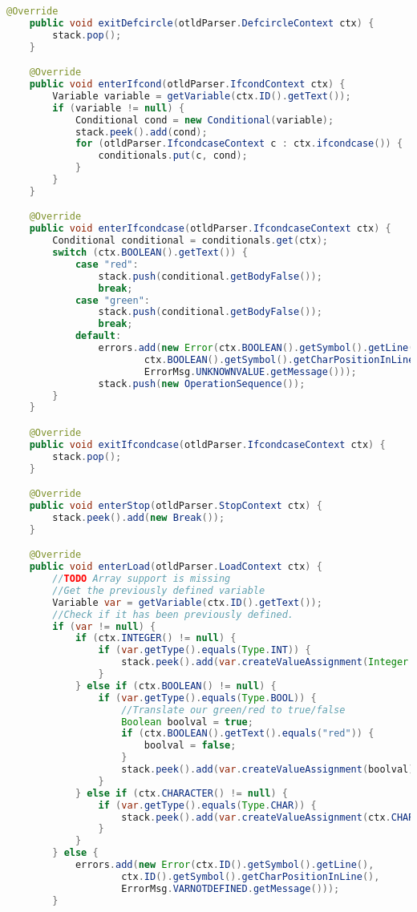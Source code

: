\begin{landscape}
\begin{lstlisting}[language=Java]
    @Override
    public void exitDefcircle(otldParser.DefcircleContext ctx) {
        stack.pop();
    }

    @Override
    public void enterIfcond(otldParser.IfcondContext ctx) {
        Variable variable = getVariable(ctx.ID().getText());
        if (variable != null) {
            Conditional cond = new Conditional(variable);
            stack.peek().add(cond);
            for (otldParser.IfcondcaseContext c : ctx.ifcondcase()) {
                conditionals.put(c, cond);
            }
        }
    }

    @Override
    public void enterIfcondcase(otldParser.IfcondcaseContext ctx) {
        Conditional conditional = conditionals.get(ctx);
        switch (ctx.BOOLEAN().getText()) {
            case "red":
                stack.push(conditional.getBodyFalse());
                break;
            case "green":
                stack.push(conditional.getBodyFalse());
                break;
            default:
                errors.add(new Error(ctx.BOOLEAN().getSymbol().getLine(),
                        ctx.BOOLEAN().getSymbol().getCharPositionInLine(),
                        ErrorMsg.UNKNOWNVALUE.getMessage()));
                stack.push(new OperationSequence());
        }
    }

    @Override
    public void exitIfcondcase(otldParser.IfcondcaseContext ctx) {
        stack.pop();
    }

    @Override
    public void enterStop(otldParser.StopContext ctx) {
        stack.peek().add(new Break());
    }

    @Override
    public void enterLoad(otldParser.LoadContext ctx) {
        //TODO Array support is missing
        //Get the previously defined variable
        Variable var = getVariable(ctx.ID().getText());
        //Check if it has been previously defined.
        if (var != null) {
            if (ctx.INTEGER() != null) {
                if (var.getType().equals(Type.INT)) {
                    stack.peek().add(var.createValueAssignment(Integer.valueOf(ctx.INTEGER().getText())));
                }
            } else if (ctx.BOOLEAN() != null) {
                if (var.getType().equals(Type.BOOL)) {
                    //Translate our green/red to true/false
                    Boolean boolval = true;
                    if (ctx.BOOLEAN().getText().equals("red")) {
                        boolval = false;
                    }
                    stack.peek().add(var.createValueAssignment(boolval));
                }
            } else if (ctx.CHARACTER() != null) {
                if (var.getType().equals(Type.CHAR)) {
                    stack.peek().add(var.createValueAssignment(ctx.CHARACTER().getText().charAt(1)));
                }
            }
        } else {
            errors.add(new Error(ctx.ID().getSymbol().getLine(),
                    ctx.ID().getSymbol().getCharPositionInLine(),
                    ErrorMsg.VARNOTDEFINED.getMessage()));
        }


\end{lstlisting}
\end{landscape}
